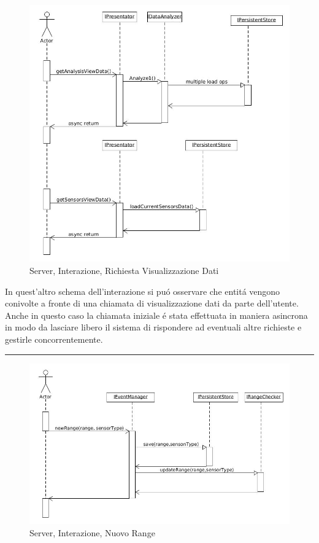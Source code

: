 \begin{figure}[h]
\centering
\includegraphics[width=\textwidth]{Figures/DomainModel/Server/GetOperationInteraction}
\caption{Server, Interazione, Richiesta Visualizzazione Dati}
\end{figure}

In quest'altro schema dell'interazione si pu\'o osservare che entit\'a vengono conivolte a fronte di una chiamata di visualizzazione dati da parte dell'utente. Anche in questo caso la chiamata iniziale \'e stata effettuata in maniera asincrona in modo da lasciare libero il sistema di rispondere ad eventuali altre richieste e gestirle concorrentemente.

\noindent\rule[0.5ex]{\linewidth}{1pt}

\begin{figure}[h]
\centering
\includegraphics[width=\textwidth]{Figures/DomainModel/Server/NewRangeInteraction}
\caption{Server, Interazione, Nuovo Range}
\end{figure}

